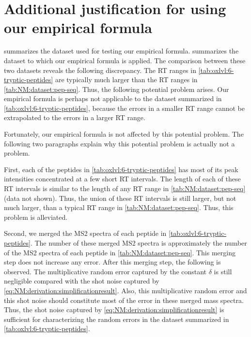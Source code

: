 \section*{Additional justification for using our empirical formula}

 summarizes the dataset used for testing our empirical formula.
 summarizes the dataset to which our empirical formula is applied.
The comparison between these two datasets reveals the following discrepancy. 
The \gls{RT} ranges in \cref{tab:oxlvl:6-tryptic-peptides} are typically much larger than the \gls{RT} ranges in \cref{tab:NM:dataset:pep-seq}.
Thus, the following potential problem arises.
Our empirical formula is perhaps not applicable to the dataset summarized in \cref{tab:oxlvl:6-tryptic-peptides}, 
	because the errors in a smaller \gls{RT} range cannot be extrapolated to the errors in a larger \gls{RT} range.
	
Fortunately, our empirical formula is not affected by this potential problem. 
The following two paragraphs explain why this potential problem is actually not a problem.

First, each of the peptides in \cref{tab:oxlvl:6-tryptic-peptides} has most of its peak intensities concentrated at a few short \gls{RT} intervals.
The length of each of these \gls{RT} intervals is similar to the length of any \gls{RT} range in \cref{tab:NM:dataset:pep-seq} (data not shown).
Thus, the union of these \gls{RT} intervals is still larger, but not much larger, than a typical \gls{RT} range in \cref{tab:NM:dataset:pep-seq}.
Thus, this problem is alleviated.

Second, we merged the \gls{MS2} spectra of each peptide in \cref{tab:oxlvl:6-tryptic-peptides}. 
The number of these merged \gls{MS2} spectra is approximately the number of the \gls{MS2} spectra of each peptide in \cref{tab:NM:dataset:pep-seq}.
This merging step does not increase any error.
After this merging step, the following is observed.
The multiplicative random error captured by the constant \(\delta\) is still negligible compared with the shot noise captured by \cref{eq:NM:derivation:simplificationresult}.
Also, this multiplicative random error and this shot noise should constitute most of the error in these merged mass spectra.
Thus, the shot noise captured by \cref{eq:NM:derivation:simplificationresult} is sufficient for characterizing the random errors in the dataset summarized in \cref{tab:oxlvl:6-tryptic-peptides}.  	

\printglossary[type=s-this-symbs]
\printglossary[type=c-math-defns]
\printglossary[type=c-rpms-defns]
\printglossary[type=\acronymtype,title=Acronyms in mass spectrometry]